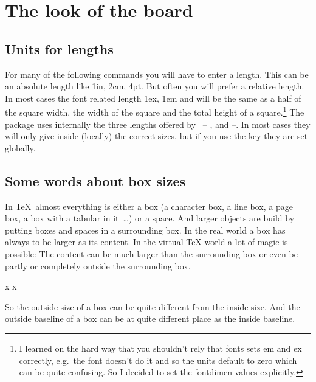 \documentclass[pagesize,parskip=half-,fontsize=12pt]{scrartcl}
\begin{document}
\section{The look of the board}

\subsection{Units for  lengths}

For many of the following commands you will have to enter a length.
This can be an absolute length like 1in, 2cm, 4pt. But often you will
prefer a relative length. In most cases the font related length 1ex,
1em and  will be the same as a half of the square
width, the width of the square and the total height of a
square.\footnote{I learned on the hard way that you shouldn't rely
that fonts sets em and ex correctly, e.g.\ the font
 doesn't do it and so the units default to zero
which can be quite confusing. So I decided to set the fontdimen
values explicitly.} The package uses internally the three lengths
offered by \chessfss\ -- ,
 and  --. In
most cases they will only give inside  (locally) the
correct sizes, but if you use the key  they are set
globally.


\subsection{Some words about box sizes}

In \TeX\ almost everything is either a box (a character box, a line
box, a page box, a box with a tabular in it~\ldots) or a space. And
larger objects are build by putting boxes and spaces in a surrounding
box. In the real world a box has always to be larger as its content.
In the virtual
\TeX-world a lot of magic is possible: The content can be much larger
than the surrounding box or even be partly or completely outside the
surrounding box.


\begin{LTXexample}
x%
%
x%
\end{LTXexample}

So the outside size of a box can be quite different from the inside
size. And the outside baseline of a box can be at quite different
place as the inside baseline.
\end{document}
